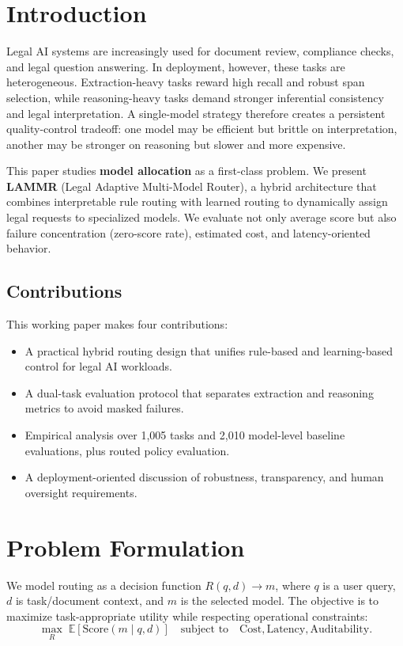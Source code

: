 \section{Introduction}
Legal AI systems are increasingly used for document review, compliance checks, and legal question answering. In deployment, however, these tasks are heterogeneous. Extraction-heavy tasks reward high recall and robust span selection, while reasoning-heavy tasks demand stronger inferential consistency and legal interpretation. A single-model strategy therefore creates a persistent quality-control tradeoff: one model may be efficient but brittle on interpretation, another may be stronger on reasoning but slower and more expensive.

This paper studies \textbf{model allocation} as a first-class problem. We present \textbf{LAMMR} (Legal Adaptive Multi-Model Router), a hybrid architecture that combines interpretable rule routing with learned routing to dynamically assign legal requests to specialized models. We evaluate not only average score but also failure concentration (zero-score rate), estimated cost, and latency-oriented behavior.

\subsection{Contributions}
This working paper makes four contributions:
\begin{itemize}[leftmargin=*]
  \item A practical hybrid routing design that unifies rule-based and learning-based control for legal AI workloads.
  \item A dual-task evaluation protocol that separates extraction and reasoning metrics to avoid masked failures.
  \item Empirical analysis over 1,005 tasks and 2,010 model-level baseline evaluations, plus routed policy evaluation.
  \item A deployment-oriented discussion of robustness, transparency, and human oversight requirements.
\end{itemize}

\section{Problem Formulation}
We model routing as a decision function $R(q, d) \rightarrow m$, where $q$ is a user query, $d$ is task/document context, and $m$ is the selected model. The objective is to maximize task-appropriate utility while respecting operational constraints:
\begin{equation}
\max_{R} \; \mathbb{E}\left[ \text{Score}(m \mid q,d) \right]
\quad \text{subject to} \quad
\text{Cost}, \text{Latency}, \text{Auditability}.
\end{equation}

